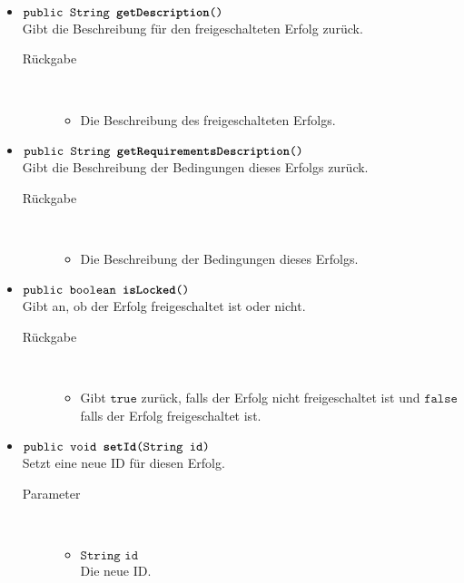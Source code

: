 \begin{description}
\begin{itemize}
\item $\texttt{public String \textbf{getDescription}()}$ \\ Gibt die Beschreibung für den freigeschalteten Erfolg zurück.
		\begin{description}
			\item[Rückgabe] \hfill \\
			\vspace{-.8cm}
			\begin{itemize}
				\item Die Beschreibung des freigeschalteten Erfolgs.
			\end{itemize}
		\end{description}

\item $\texttt{public String \textbf{getRequirementsDescription}()}$ \\ Gibt die Beschreibung der Bedingungen dieses Erfolgs zurück.
		\begin{description}
			\item[Rückgabe] \hfill \\
			\vspace{-.8cm}
			\begin{itemize}
				\item Die Beschreibung der Bedingungen dieses Erfolgs.
			\end{itemize}
		\end{description}

\item $\texttt{public boolean \textbf{isLocked}()}$ \\ Gibt an, ob der Erfolg freigeschaltet ist oder nicht.
		\begin{description}
			\item[Rückgabe] \hfill \\
			\vspace{-.8cm}
			\begin{itemize}
				\item Gibt $\texttt{true}$ zurück, falls der Erfolg nicht freigeschaltet ist und $\texttt{false}$ falls der Erfolg freigeschaltet ist.
			\end{itemize}
		\end{description}

	\item $\texttt{public void \textbf{setId}(String id)}$ \\ Setzt eine neue ID für diesen Erfolg.
		\begin{description}
			\item[Parameter] \hfill \\
			\vspace{-.8cm}
			\begin{itemize}
				\item $\texttt{String id}$ \\ Die neue ID.
			\end{itemize}
		\end{description}


\end{itemize}
\end{description}
